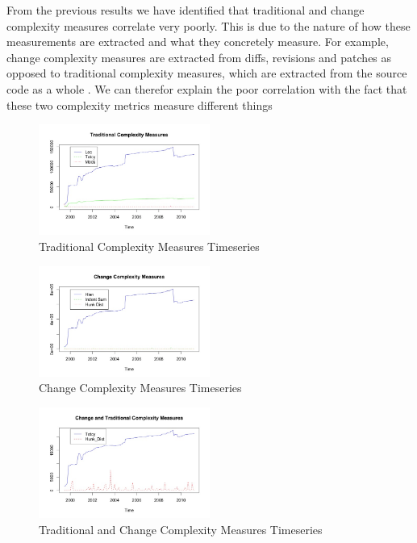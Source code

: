 \documentclass[9pt,twocolumn,a4paper]{article}
\begin{document}
From the previous results we have identified that traditional and change complexity measures correlate very poorly. This is due to the nature of how these measurements are extracted and what they concretely measure. For example, change complexity measures are extracted from diffs, revisions and patches as opposed to traditional complexity measures, which are extracted from the source code as a whole \cite{Hindle}. We can therefor explain the poor correlation with the fact that these two complexity metrics measure different things

\begin{figure}[h!]
  \centering
  \includegraphics[width=0.5\textwidth]{TradComplexityMeasuresPlot}
   \caption{Traditional Complexity Measures Timeseries }
   \label{fig:tct}
\end{figure}

\begin{figure}[h!]
  \centering
  \includegraphics[width=0.5\textwidth]{ChangeComplexMeasuresPlot}
   \caption{Change Complexity Measures Timeseries }
   \label{fig:cct}
\end{figure}

\begin{figure}[h!]
  \centering
  \includegraphics[width=0.5\textwidth]{ChangeandTradPlot}
   \caption{Traditional and Change Complexity Measures Timeseries }
   \label{fig:TandCCT}
\end{figure}
\end{document}

